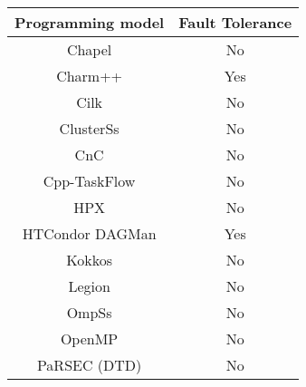 \begin{tabular}{cc}
\hline
Programming model & Fault Tolerance \\
\hline
Chapel & No\\
Charm++ & Yes\\
Cilk & No\\
ClusterSs & No\\
CnC & No\\
Cpp-TaskFlow & No\\
HPX & No\\
HTCondor DAGMan & Yes\\
Kokkos & No\\
Legion & No\\
OmpSs & No\\
OpenMP & No\\
PaRSEC (DTD) & No\\
\hline
\end{tabular}

